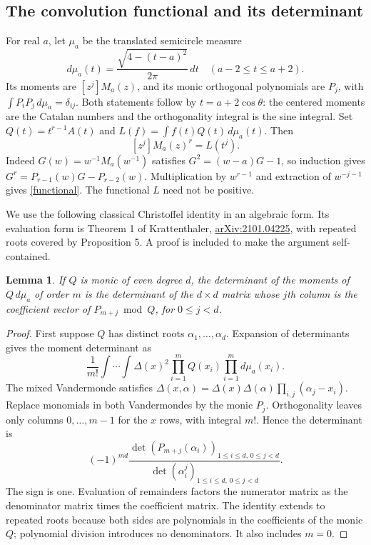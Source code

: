\documentclass[10pt]{article}
\newtheorem{lemma}{Lemma}
\begin{document}
\subsection*{The convolution functional and its determinant}
For real $a$, let $\mu_a$ be the translated semicircle measure
\[
 d\mu_a(t)=\frac{\sqrt{4-(t-a)^2}}{2\pi}\,dt\quad(a-2\le t\le a+2).
\]
Its moments are $[z^j]M_a(z)$, and its monic orthogonal polynomials
are $P_j$, with $\int P_iP_j\,d\mu_a=\delta_{ij}$. Both statements
follow by $t=a+2\cos\theta$: the centered moments are the Catalan
numbers and the orthogonality integral is the sine integral.
Set $Q(t)=t^{r-1}A(t)$ and $L(f)=\int f(t)Q(t)\,d\mu_a(t)$.
Then
\begin{equation}\label{functional}
 [z^j]M_a(z)^r=L(t^j).
\end{equation}
Indeed $G(w)=w^{-1}M_a(w^{-1})$ satisfies $G^2=(w-a)G-1$,
so induction gives $G^r=P_{r-1}(w)G-P_{r-2}(w)$. Multiplication
by $w^{r-1}$ and extraction of $w^{-j-1}$ gives \eqref{functional}.
The functional $L$ need not be positive.

We use the following classical Christoffel identity in an algebraic
form. Its evaluation form is Theorem 1 of Krattenthaler,
\href{https://arxiv.org/abs/2101.04225}{arXiv:2101.04225}, with
repeated roots covered by Proposition 5. A proof is included to make
the argument self-contained.

\begin{lemma}\label{remainder}
If $Q$ is monic of even degree $d$, the determinant of the moments
of $Q\,d\mu_a$ of order $m$ is the determinant of the $d\times d$
matrix whose $j$th column is the coefficient vector of
$P_{m+j}\bmod Q$, for $0\le j<d$.
\end{lemma}
\begin{proof}
First suppose $Q$ has distinct roots $\alpha_1,\ldots,\alpha_d$.
Expansion of determinants gives the moment determinant as
\[
 \frac1{m!}\int\cdots\int\Delta(x)^2\prod_{i=1}^m Q(x_i)
 \prod_{i=1}^m d\mu_a(x_i).
\]
The mixed Vandermonde satisfies
$\Delta(x,\alpha)=\Delta(x)\Delta(\alpha)\prod_{i,j}(\alpha_j-x_i)$.
Replace monomials in both Vandermondes by the monic $P_j$.
Orthogonality leaves only columns $0,\ldots,m-1$ for the $x$ rows,
with integral $m!$. Hence the determinant is
\[
 (-1)^{md}\frac{\det(P_{m+j}(\alpha_i))_{1\le i\le d,\,0\le j<d}}
 {\det(\alpha_i^j)_{1\le i\le d,\,0\le j<d}}.
\]
The sign is one. Evaluation of remainders factors the numerator
matrix as the denominator matrix times the coefficient matrix.
The identity extends to repeated roots because both sides are
polynomials in the coefficients of the monic $Q$; polynomial
division introduces no denominators. It also includes $m=0$.
\end{proof}
\end{document}
